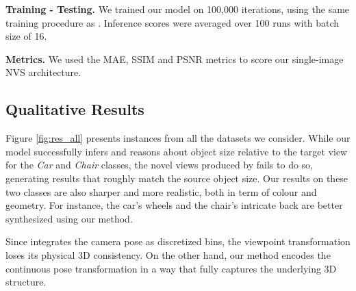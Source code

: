 \noindent\textbf{Training - Testing.} We trained our model on 100,000 iterations, using the same training procedure as \citep{kim2020novel}. Inference scores were averaged over 100 runs with batch size of 16. \newline

\noindent\textbf{Metrics.} We used the \ac{MAE},  \ac{SSIM} \citep{wang2004image} and \ac{PSNR} metrics to score our single-image \ac{NVS} architecture. 

\subsection{Qualitative Results}

Figure \ref{fig:res_all} presents instances from all the datasets we consider. While our model successfully infers and reasons about object size relative to the target view for the \textit{Car} and \textit{Chair} classes, the novel views produced by \citep{kim2020novel} fails to do so, generating results that roughly match the source object size. Our results on these two classes are also sharper and more realistic, both in term of colour and geometry. For instance, the car's wheels and the chair's intricate back are better synthesized using our method. 

Since \citep{kim2020novel} integrates the camera pose as discretized bins, the viewpoint transformation loses its physical 3D consistency. On the other hand, our method encodes the continuous pose transformation in a way that fully captures the underlying 3D structure.\newline


